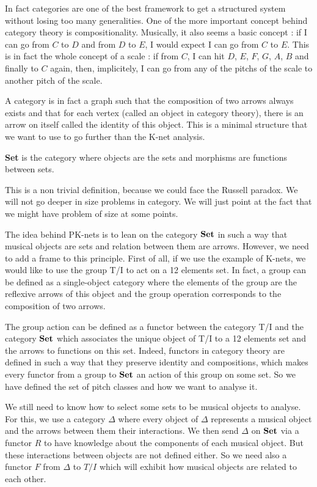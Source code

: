 In fact categories are one of the best framework to get a structured system without losing too many generalities.
One of the more important concept behind category theory is compositionality. Musically, it also seems a basic concept : if I can go from $C$ to $D$ and from $D$ to $E$, I would expect I can go from $C$ to $E$. This is in fact the whole concept of a scale : if from $C$, I can hit $D$, $E$, $F$, $G$, $A$, $B$ and finally to $C$ again, then, implicitely, I can go from any of the pitchs of the scale to another pitch of the scale.

A category is in fact a graph such that the composition of two arrows always exists and that for each vertex (called an object in category theory), there is an arrow on itself called the identity of this object. This is a minimal structure that we want to use to go further than the K-net analysis.

\begin{defn}\textbf{Set}\label{nomencl:Set} is the category where objects are the sets and morphisms are functions between sets.
\end{defn}

This is a non trivial definition, because we could face the Russell paradox. We will not go deeper in size problems in category. We will just point at the fact that we might have problem of size at some points.


The idea behind PK-nets is to lean on the category $\bf Set$ in such a way that musical objects are sets and relation between them are arrows. However, we need to add a frame to this principle. First of all, if we use the example of K-nets, we would like to use the group T/I to act on a 12 elements set. In fact, a group can be defined as a single-object category where the elements of the group are the reflexive arrows of this object and the group operation corresponds to the composition of two arrows.

The group action can be defined as a functor between the category T/I and the category $\bf Set$ which associates the unique object of T/I to a 12 elements set and the arrows to functions on this set. Indeed, functors in category theory are defined in such a way that they preserve identity and compositions, which makes every functor from a group to $\bf Set$ an action of this group on some set. So we have defined the set of pitch classes and how we want to analyse it.

We still need to know how to select some sets to be musical objects to analyse. For this, we use a category $\Delta$ where every object of $\Delta$ represents a musical object and the arrows between them their interactions. We then send  $\Delta$ on $\bf Set$ via a functor $R$ to have knowledge about the components of each musical object. But these interactions between objects are not defined either. So we need also a functor $F$ from $\Delta$ to $T/I$ which will exhibit how musical objects are related to each other.

